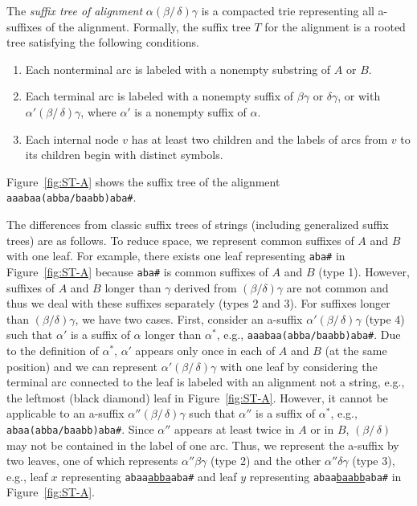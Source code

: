 \documentclass{llncs}
\newcommand{\partitle}[1]{}                        \newcommand{\commentout}[1]{}
\newcommand{\be}{\begin{enumerate}}
\newcommand{\ee}{\end{enumerate}}
\begin{document}
The {\em suffix tree of alignment} $\alpha (\beta /\,\delta) \gamma$
 is a compacted trie representing all a-suffixes of the alignment.
Formally, the suffix tree $T$ for the alignment
 is a rooted tree satisfying the following conditions.
\be
\item Each nonterminal arc is labeled with a nonempty substring of $A$ or $B$.
\item Each terminal arc is labeled with a nonempty suffix of $\beta \gamma$ or $\delta \gamma$,
       or with $\alpha'(\beta /\, \delta) \gamma$, where $\alpha'$ is a nonempty suffix of $\alpha$.
\item Each internal node $v$ has at least two children
       and the labels of arcs from $v$ to its children begin with distinct symbols.
\ee
Figure~\ref{fig:ST-A} shows the suffix tree of the alignment
{\tt aaabaa(abba/baabb)aba\#}.


\partitle{Difference}

The differences from classic suffix trees of strings
 (including generalized suffix trees) are as follows.
To reduce space, we represent common suffixes of $A$ and $B$ with one leaf.
For example, there exists one leaf representing {\tt aba\#} in Figure~\ref{fig:ST-A}
 because {\tt aba\#} is common suffixes of $A$ and $B$ (type 1).
However, suffixes of $A$ and $B$ longer than $\gamma$ derived from $(\beta / \delta)\gamma$
 are not common
 and thus we deal with these suffixes separately (types 2 and 3).
For suffixes longer than $(\beta / \delta)\gamma$,
 we have two cases.
First, consider an a-suffix $\alpha' (\beta /\, \delta) \gamma$ (type 4)
 such that $\alpha'$ is a suffix of $\alpha$ longer than $\alpha^{*}$,
 e.g., {\tt aaabaa(abba/baabb)aba\#}.
Due to the definition of $\alpha^{*}$,
 $\alpha'$ appears only once in each of $A$ and $B$ (at the same position)
 and we can represent $\alpha' (\beta /\, \delta) \gamma$ with one leaf
 by considering the terminal arc connected to the leaf
 is labeled with an alignment not a string,
 e.g., the leftmost (black diamond) leaf in Figure~\ref{fig:ST-A}.
However, it cannot be applicable to an a-suffix $\alpha'' (\beta /\, \delta) \gamma$
 such that $\alpha''$ is a suffix of $\alpha^{*}$,
 e.g., {\tt abaa(abba/baabb)aba\#}.
Since $\alpha''$ appears at least twice in $A$ or in $B$,
 $(\beta /\, \delta)$ may not be contained in the label of one arc.
Thus, we represent the a-suffix by two leaves,
 one of which represents $\alpha'' \beta \gamma$ (type 2)
 and the other $\alpha'' \delta \gamma$ (type 3),
 e.g., leaf $x$ representing {\tt abaa\underline{abba}aba\#}
 and leaf $y$ representing {\tt abaa\underline{baabb}aba\#}
 in Figure~\ref{fig:ST-A}.
\end{document}
